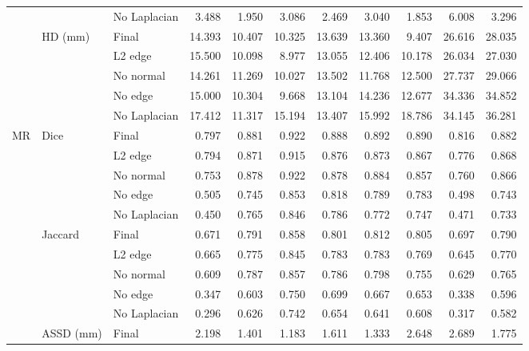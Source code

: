 \documentclass[times,review,preprint,authoryear]{elsarticle}
\begin{document}
\begin{table}[H]
{{\begin{tabular}{lllrrrrrrrr}
   &         & No Laplacian &   3.488 &   1.950 &   3.086 &   2.469 &   3.040 &   1.853 &   6.008 &   3.296 \\
\cline{2-11}
   & \multirow{5}{*}{HD (mm)} & Final &  14.393 &  10.407 &  10.325 &  13.639 &  13.360 &   9.407 &  26.616 &  28.035 \\
   &         & L2 edge &  15.500 &  10.098 &   8.977 &  13.055 &  12.406 &  10.178 &  26.034 &  27.030 \\
   &         & No normal &  14.261 &  11.269 &  10.027 &  13.502 &  11.768 &  12.500 &  27.737 &  29.066 \\
   &         & No edge &  15.000 &  10.304 &   9.668 &  13.104 &  14.236 &  12.677 &  34.336 &  34.852 \\
   &         & No Laplacian &  17.412 &  11.317 &  15.194 &  13.407 &  15.992 &  18.786 &  34.145 &  36.281 \\
\cline{1-11}
\cline{2-11}
\multirow{20}{*}{MR} & \multirow{5}{*}{Dice} & Final &   0.797 &   0.881 &   0.922 &   0.888 &   0.892 &   0.890 &   0.816 &   0.882 \\
   &         & L2 edge &   0.794 &   0.871 &   0.915 &   0.876 &   0.873 &   0.867 &   0.776 &   0.868 \\
   &         & No normal &   0.753 &   0.878 &   0.922 &   0.878 &   0.884 &   0.857 &   0.760 &   0.866 \\
   &         & No edge &   0.505 &   0.745 &   0.853 &   0.818 &   0.789 &   0.783 &   0.498 &   0.743 \\
   &         & No Laplacian &   0.450 &   0.765 &   0.846 &   0.786 &   0.772 &   0.747 &   0.471 &   0.733 \\
\cline{2-11}
   & \multirow{5}{*}{Jaccard} & Final &   0.671 &   0.791 &   0.858 &   0.801 &   0.812 &   0.805 &   0.697 &   0.790 \\
   &         & L2 edge &   0.665 &   0.775 &   0.845 &   0.783 &   0.783 &   0.769 &   0.645 &   0.770 \\
   &         & No normal &   0.609 &   0.787 &   0.857 &   0.786 &   0.798 &   0.755 &   0.629 &   0.765 \\
   &         & No edge &   0.347 &   0.603 &   0.750 &   0.699 &   0.667 &   0.653 &   0.338 &   0.596 \\
   &         & No Laplacian &   0.296 &   0.626 &   0.742 &   0.654 &   0.641 &   0.608 &   0.317 &   0.582 \\
\cline{2-11}
   & \multirow{5}{*}{ASSD (mm)} & Final &   2.198 &   1.401 &   1.183 &   1.611 &   1.333 &   2.648 &   2.689 &   1.775 \\

\end{tabular}}}
\end{table}
\end{document}

